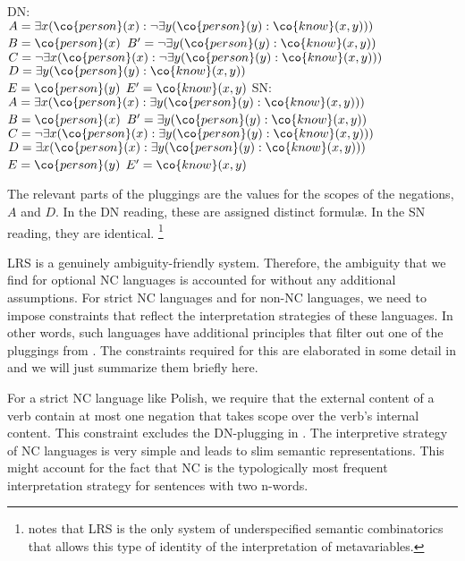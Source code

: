 \documentclass[output=paper]{langsci/langscibook}
\begin{document}
\ea \label{personne-personne-plug}
\begin{xlist}
\ex DN:\label{pers-pers-DN}\\
$A = \exists x (\co{person}(x) : \lnot \exists y (\co{person}(y) : \co{know}(x,y)))$\\
$B = \co{person}(x)$ \qquad 
$B' = \lnot \exists y (\co{person}(y) : \co{know}(x,y))$\\
$C = \lnot \exists x (\co{person}(x) : \lnot \exists y (\co{person}(y) : \co{know}(x,y)))$\\
$D = \exists y (\co{person}(y) : \co{know}(x,y))$\\
$E = \co{person}(y)$ \qquad 
$E' = \co{know}(x,y)$
\ex SN:\label{pers-pers-SN}\\
$A = \exists x (\co{person}(x) : \exists y (\co{person}(y) : \co{know}(x,y)))$\\
$B = \co{person}(x)$ \qquad 
$B' = \exists y (\co{person}(y) : \co{know}(x,y))$\\
$C = \lnot \exists x (\co{person}(x) : \exists y (\co{person}(y) : \co{know}(x,y)))$\\
$D = \exists x (\co{person}(x) : \exists y (\co{person}(y) : \co{know}(x,y)))$\\
$E = \co{person}(y)$ \qquad 
$E' = \co{know}(x,y)$
\end{xlist}
\z 

The relevant parts of the pluggings are the values for the scopes of the negations, $A$ and $D$. In the DN reading, these are assigned distinct formulæ. In the SN reading, they are identical.%
\footnote{\citet{Egg:10} notes that
LRS is the only system of underspecified semantic combinatorics that allows this type of identity of the interpretation of metavariables.}

LRS is a genuinely ambiguity-friendly system. Therefore, the
ambiguity that we find for optional NC languages is accounted for without any additional assumptions. 
For strict NC languages and for non-NC languages, we need to impose constraints that reflect the interpretation strategies of these languages. 
In other words, such languages have additional principles that filter out one of the pluggings from . 
The constraints required for this are elaborated in some detail in \citet{Richter:Sailer:06} and we will just summarize them briefly here.

For a strict NC language like Polish, we require that the external content of a verb contain at most one negation that takes scope over the verb's internal content. This constraint  excludes the DN-plugging in .
The interpretive strategy of NC languages is very simple and leads to slim semantic representations. This might account for the fact that NC is the typologically most frequent interpretation strategy for sentences with two n-words.
\end{document}
